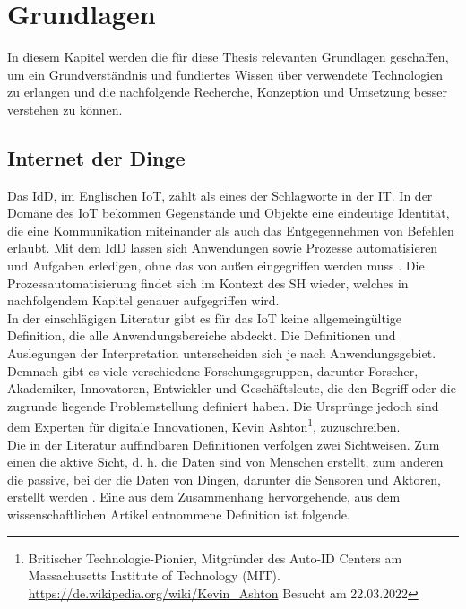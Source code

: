 \chapter{Grundlagen}
\label{chap:grundlagen}
    In diesem Kapitel werden die für diese Thesis relevanten Grundlagen geschaffen, um ein Grundverständnis und 
    fundiertes Wissen über verwendete Technologien zu erlangen und die nachfolgende Recherche, Konzeption und 
    Umsetzung besser verstehen zu können. 

\section{Internet der Dinge}
\label{sec:iot}
    Das \ac{IdD}, im Englischen \ac{IoT}, zählt als eines der Schlagworte in der \ac{IT}. In der Domäne des \acs{IoT} bekommen 
    Gegenstände und Objekte eine eindeutige Identität, die eine Kommunikation miteinander als auch das Entgegennehmen von 
    Befehlen erlaubt. Mit dem \acl{IdD} lassen sich Anwendungen sowie Prozesse automatisieren und Aufgaben erledigen, ohne das 
    von außen eingegriffen werden muss \cite{bigdatainsider2016}. Die Prozessautomatisierung findet sich im Kontext des 
    \acl{SH} wieder, welches in nachfolgendem Kapitel genauer aufgegriffen wird. 
    \\
    \linebreak
    In der einschlägigen Literatur gibt es für das \acl{IoT} keine allgemeingültige Definition, die alle Anwendungsbereiche abdeckt. 
    Die Definitionen und Auslegungen der Interpretation unterscheiden sich je nach Anwendungsgebiet. Demnach gibt es viele verschiedene 
    Forschungsgruppen, darunter Forscher, Akademiker, Innovatoren, Entwickler und Geschäftsleute, die den Begriff oder die zugrunde liegende 
    Problemstellung definiert haben. Die Ursprünge jedoch sind dem Experten für digitale Innovationen, 
    Kevin Ashton\footnote{Britischer Technologie-Pionier, Mitgründer des Auto-ID Centers am Massachusetts Institute of Technology (MIT). \url{https://de.wikipedia.org/wiki/Kevin_Ashton} Besucht am 22.03.2022}, 
    zuzuschreiben. 
    \\ 
    Die in der Literatur auffindbaren Definitionen verfolgen zwei Sichtweisen. Zum einen die aktive Sicht, d. h. 
    die Daten sind von Menschen erstellt, zum anderen die passive, bei der die Daten von Dingen, darunter die Sensoren und Aktoren, 
    erstellt werden \cite{Madakam2015}. Eine aus dem Zusammenhang hervorgehende, aus dem wissenschaftlichen Artikel entnommene 
    Definition ist folgende.
